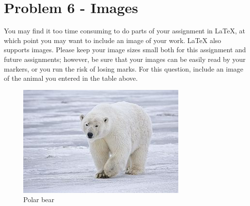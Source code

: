 \documentclass[12pt]{article}
\begin{document}
\section*{Problem 6 - Images}
You may find it too time consuming to do parts of your assignment in \LaTeX{}, at which 
point you may want to include an image of your work. \LaTeX{} also supports images. 
Please keep your image sizes small both for this assignment and future assignments; 
however, be sure that your images can be easily read by your markers, or you run the 
risk of losing marks. For this question, include an image of the animal you entered
in the table above.\\


\begin{figure}
\begin{center}
        \includegraphics[scale=0.5]{polar_bear.jpg}
\end{center}
\caption{\label{figcaption} Polar bear}
\end{figure}
\end{document}
